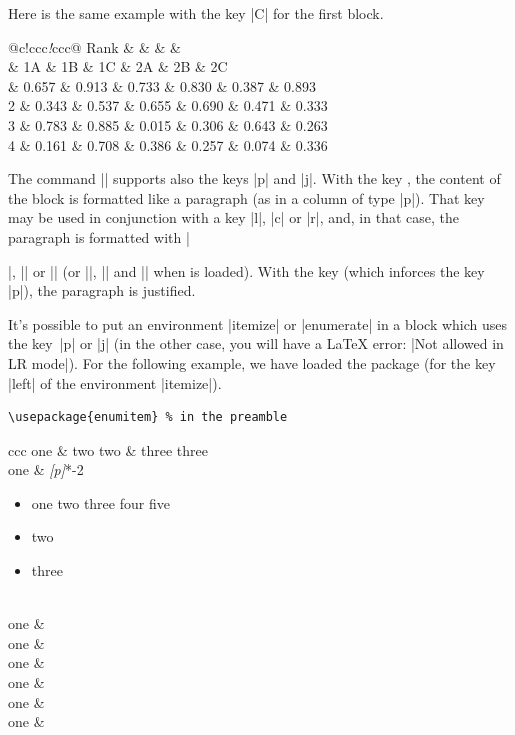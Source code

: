 \documentclass[dvipsnames]{article}
\begin{document}
\medskip
Here is the same example with the key |C| for the first block.

\medskip
\begin{Code}
\begin{NiceTabular}{@{}c!{\qquad}ccc\emph{!{\qquad}}ccc@{}}
\toprule
  Rank & \emph{} & & &  \\
       & 1A & 1B & 1C & 2A & 2B & 2C \\
 & 0.657 & 0.913 & 0.733 & 0.830 & 0.387 & 0.893\\
  2 & 0.343 & 0.537 & 0.655 & 0.690 & 0.471 & 0.333\\
  3 & 0.783 & 0.885 & 0.015 & 0.306 & 0.643 & 0.263\\
  4 & 0.161 & 0.708 & 0.386 & 0.257 & 0.074 & 0.336\\
\bottomrule
\end{NiceTabular}
\end{Code}

\bigskip
The command |\Block| supports also the keys |p| and |j|. With the key , the
content of the block is formatted like a paragraph (as in a column of type |p|).
That key may be used in conjunction with a key |l|, |c| or |r|, and, in that
case, the paragraph is formatted with |\raggedright|, |\centering| or
|\raggedleft| (or |\RaggedRight|, |\Centering| and |\RaggedLeft| when 
is loaded). With the key  (which inforces the key |p|), the paragraph is
justified.

\bigskip
It's possible to put an environment |{itemize}| or |{enumerate}| in a block
which uses the key~|p| or |j| (in the other case, you will have a LaTeX error:
|Not allowed in LR mode|). For the following example, we have loaded the package
 (for the key |left| of the environment |{itemize}|).

\smallskip
\begin{Verbatim}[formatcom = \footnotesize\color{gray}]
\usepackage{enumitem} % in the preamble
\end{Verbatim}

\smallskip
\begin{Code}[width=10cm,show-output]
\begin{NiceTabular}[hvlines]{ccc}
  one & two two & three three \\
  one & 
  \Block\emph{[p]}{*-2}{%
  \begin{itemize}[\emph{left=0pt}]
  \item one two three four five 
  \item two 
  \item three
  \end{itemize}
  } \\
  one & \\
  one & \\
  one & \\
  one & \\
  one & \\
  one & \\
\end{NiceTabular}
\end{Code}
\end{document}
